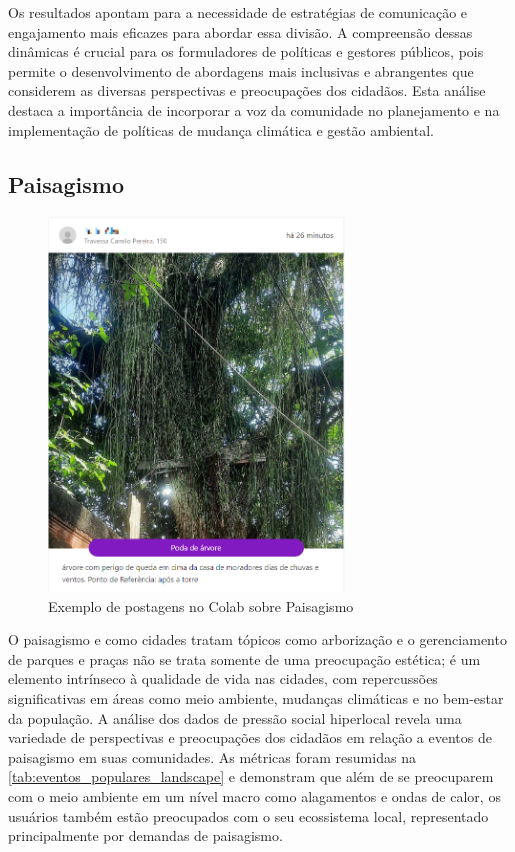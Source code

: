 Os resultados apontam para a necessidade de estratégias de comunicação e engajamento mais eficazes para abordar essa divisão. A compreensão dessas dinâmicas é crucial para os formuladores de políticas e gestores públicos, pois permite o desenvolvimento de abordagens mais inclusivas e abrangentes que considerem as diversas perspectivas e preocupações dos cidadãos. Esta análise destaca a importância de incorporar a voz da comunidade no planejamento e na implementação de políticas de mudança climática e gestão ambiental.

\subsection{Paisagismo}
\label{sec:eventos_populares_landscape}

\begin{figure}[htb]
	\centering
	\includegraphics[width=0.7\textwidth]{images/colab_posts_paisagismo.png}
	\caption{Exemplo de postagens no Colab sobre Paisagismo}
	\label{fig:colab_posts_paisagismo}
\end{figure}

O paisagismo e como cidades tratam tópicos como arborização e o gerenciamento de parques e praças não se trata somente de uma preocupação estética; é um elemento intrínseco à qualidade de vida nas cidades, com repercussões significativas em áreas como meio ambiente, mudanças climáticas e no bem-estar da população. A análise dos dados de pressão social hiperlocal revela uma variedade de perspectivas e preocupações dos cidadãos em relação a eventos de paisagismo em suas comunidades. As métricas foram resumidas na \autoref{tab:eventos_populares_landscape} e demonstram que além de se preocuparem com o meio ambiente em um nível macro como alagamentos e ondas de calor, os usuários também estão preocupados com o seu ecossistema local, representado principalmente por demandas de paisagismo.

